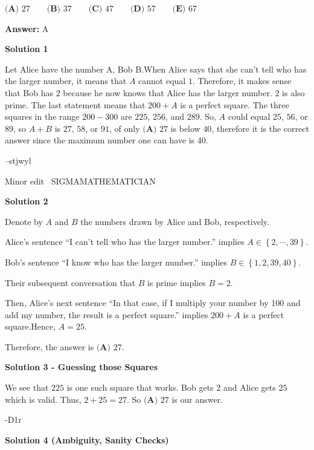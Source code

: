 \begin{enumerate}
 $\textbf{(A) }27\qquad\textbf{(B) }37\qquad\textbf{(C) }47\qquad\textbf{(D) }57\qquad\textbf{(E) }67$

 \textbf{Answer: }A



\textbf{Solution 1}

Let Alice have the number A, Bob B.When Alice says that she can't tell who has the larger number, it means that $A$ cannot equal $1$. Therefore, it makes sense that Bob has $2$ because he now knows that Alice has the larger number. $2$ is also prime. The last statement means that $200+A$ is a perfect square. The three squares in the range $200-300$ are $225$, $256$, and $289$. So, $A$ could equal $25$, $56$, or $89$, so $A+B$ is $27$, $58$, or $91$, of only $\boxed{\textbf{(A) }27}$ is below $40$, therefore it is the correct answer since the maximum number one can have is 40.

 --stjwyl

 Minor edit ~SIGMAMATHEMATICIAN

 



\textbf{Solution 2}

Denote by $A$ and $B$ the numbers drawn by Alice and Bob, respectively.

 Alice's sentence “I can't tell who has the larger number.” implies $A \in \left\{ 2 , \cdots , 39 \right\}$.

 Bob's sentence “I know who has the larger number.” implies $B \in \left\{ 1 , 2 , 39, 40 \right\}$.

 Their subsequent conversation that $B$ is prime implies $B = 2$.

 Then, Alice's next sentence  “In that case, if I multiply your number by 100 and add my number, the result is a perfect square.” implies $200 + A$ is a perfect square.Hence, $A = 25$.

 Therefore, the answer is $\boxed{\textbf{(A) }27}$.

 



\textbf{Solution 3 - Guessing those Squares}

We see that $225$ is one such square that works. Bob gets $2$ and Alice gets $25$ which is valid. Thus, $2 + 25 = 27.$ So $\boxed{\textbf{(A) }27}$ is our answer.

 -D1r

 



\textbf{Solution 4 (Ambiguity, Sanity Checks)}


\end{enumerate}

